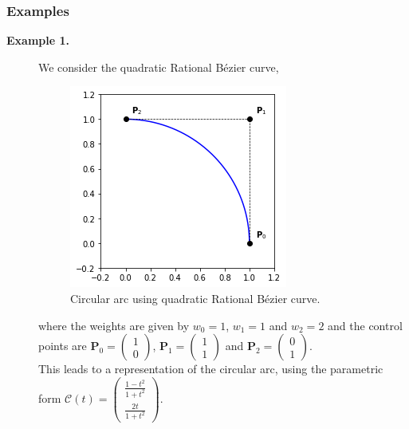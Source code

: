 \subsubsection*{Examples}
\begin{description}
  \item[\textbf{Example 1.}] We consider the quadratic Rational B\'ezier curve, 

    \begin{figure}
    \centering
    \includegraphics[width=.6\textwidth]{figures/cad/bezier/rational_ex1}
    \caption{Circular arc using quadratic Rational B\'ezier curve.}
    \label{fig:bezier-rational-ex1}
    \end{figure}

    where the weights are given by $w_0 = 1$, $w_1=1$ and $w_2=2$ and the control points are 
    $\mathbf{P}_0 = \begin{pmatrix} 1 \\ 0 \end{pmatrix}$,
    $\mathbf{P}_1 = \begin{pmatrix} 1 \\ 1 \end{pmatrix}$ and
    $\mathbf{P}_2 = \begin{pmatrix} 0 \\ 1 \end{pmatrix}$.
    \\
    This leads to a representation of the circular arc, using the parametric form $\mathcal{C}(t) = \begin{pmatrix} \frac{1-t^2}{1+t^2} \\ \frac{2t}{1+t^2} \end{pmatrix}$.
\end{description}


